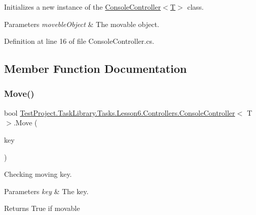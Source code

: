 Initializes a new instance of the \mbox{\hyperlink{class_test_project_1_1_task_library_1_1_tasks_1_1_lesson6_1_1_controllers_1_1_console_controller_abe440b796b1574349a0d21652b9442b0}{Console\+Controller$<$\+T$>$}} class. 


\begin{DoxyParams}{Parameters}
{\em moveble\+Object} & The movable object.\\
\hline
\end{DoxyParams}


Definition at line 16 of file Console\+Controller.\+cs.



\subsection{Member Function Documentation}
\mbox{\label{class_test_project_1_1_task_library_1_1_tasks_1_1_lesson6_1_1_controllers_1_1_console_controller_aa3d135155e9e718748be0eb0f8d2f433}} 
\subsubsection{\texorpdfstring{Move()}{Move()}}
{\footnotesize\ttfamily bool \mbox{\hyperlink{class_test_project_1_1_task_library_1_1_tasks_1_1_lesson6_1_1_controllers_1_1_console_controller}{Test\+Project.\+Task\+Library.\+Tasks.\+Lesson6.\+Controllers.\+Console\+Controller}}$<$ T $>$.Move (\begin{DoxyParamCaption}\item[{Console\+Key}]{key }\end{DoxyParamCaption})}



Checking moving key. 


\begin{DoxyParams}{Parameters}
{\em key} & The key.\\
\hline
\end{DoxyParams}
\begin{DoxyReturn}{Returns}
True if movable
\end{DoxyReturn}


